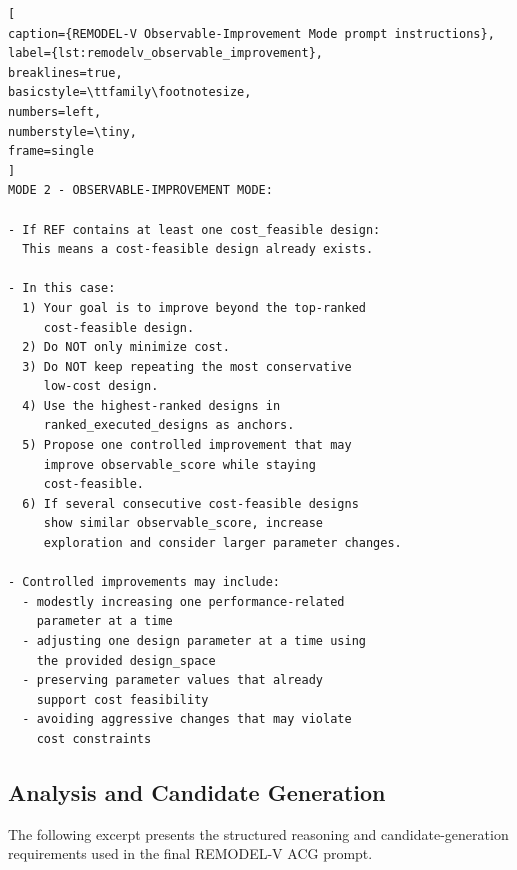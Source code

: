 \begin{lstlisting}[
caption={REMODEL-V Observable-Improvement Mode prompt instructions},
label={lst:remodelv_observable_improvement},
breaklines=true,
basicstyle=\ttfamily\footnotesize,
numbers=left,
numberstyle=\tiny,
frame=single
]
MODE 2 - OBSERVABLE-IMPROVEMENT MODE:

- If REF contains at least one cost_feasible design:
  This means a cost-feasible design already exists.

- In this case:
  1) Your goal is to improve beyond the top-ranked
     cost-feasible design.
  2) Do NOT only minimize cost.
  3) Do NOT keep repeating the most conservative
     low-cost design.
  4) Use the highest-ranked designs in
     ranked_executed_designs as anchors.
  5) Propose one controlled improvement that may
     improve observable_score while staying
     cost-feasible.
  6) If several consecutive cost-feasible designs
     show similar observable_score, increase
     exploration and consider larger parameter changes.

- Controlled improvements may include:
  - modestly increasing one performance-related
    parameter at a time
  - adjusting one design parameter at a time using
    the provided design_space
  - preserving parameter values that already
    support cost feasibility
  - avoiding aggressive changes that may violate
    cost constraints
\end{lstlisting}


\subsection{Analysis and Candidate Generation}
\label{app:remodelv_prompts_acg}

The following excerpt presents the structured
reasoning and candidate-generation requirements
used in the final REMODEL-V ACG prompt.

